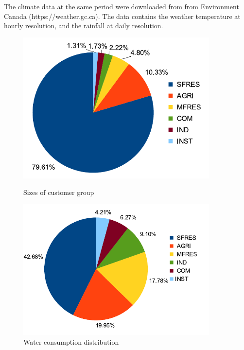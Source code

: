 \documentclass{sig-alternate}
\begin{document}
The climate data at the same period were downloaded from from Environment Canada (https://weather.gc.ca). The data contains the weather temperature at hourly resolution, and the rainfall at daily resolution.
\begin{figure}[htp]
\centering
\begin{minipage}[b]{0.35\linewidth}
\includegraphics[width=0.9\textwidth]{images/watercustomergroups}
\vspace{-5pt}
\caption{Sizes of customer group}
\label{fig:watercustomergroups}
\end{minipage}
\begin{minipage}[b]{0.39\linewidth}
\includegraphics[width=0.9\textwidth]{images/waterconsumptiondist}
\vspace{-5pt}
\caption{Water consumption distribution}
\label{fig:waterconsumptiondist}
\end{minipage}
\end{figure}
\end{document}
